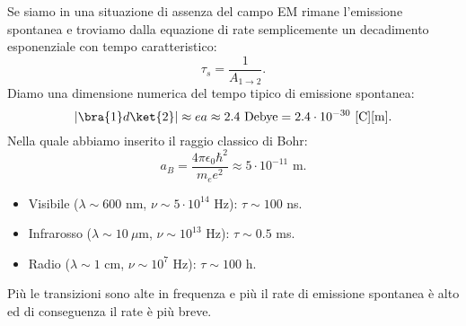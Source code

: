 Se siamo in una situazione di assenza del campo EM rimane l'emissione spontanea e troviamo dalla equazione di rate semplicemente un decadimento esponenziale con tempo caratteristico:
\[
\tau_{s}=\frac{1}{A_{1\to 2}}
.\] 
Diamo una dimensione numerica del tempo tipico di emissione spontanea:
\[
    \left|\bra{1}d\ket{2}\right|\approx ea \approx 2.4 \text{ Debye} = 2.4\cdot 10^{-30}\text{ [C][m]}
.\] 
Nella quale abbiamo inserito il raggio classico di Bohr:
\[
    a_B = \frac{4\pi\epsilon_0\hbar ^2}{m_ee^2} \approx 5\cdot 10^{-11} \text{ m}
.\] 
\begin{itemize}
    \item Visibile ($\lambda\sim 600$ nm, $\nu  \sim 5\cdot 10^{14}$ Hz): $\tau\sim 100$ ns.
    \item Infrarosso ($\lambda\sim 10 \ \mu$m, $\nu\sim 10^{13}$ Hz): $\tau  \sim 0.5 $ ms.
    \item Radio ($\lambda  \sim 1$ cm, $\nu\sim 10^{7}$ Hz): $\tau\sim 100$ h.
\end{itemize}
Più le transizioni sono alte in frequenza e più il rate di emissione spontanea è alto ed di conseguenza il rate è più breve.
